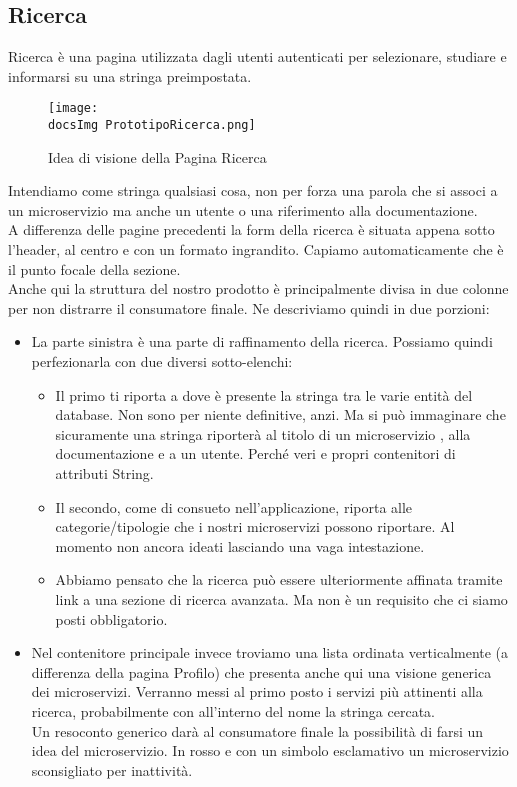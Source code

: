 {	\subsection{Ricerca}{
		Ricerca è una pagina utilizzata dagli utenti autenticati per selezionare, studiare e informarsi su una stringa preimpostata.\\
		\begin{figure}[H]
			\centering
			\texttt{[image: \\docsImg PrototipoRicerca.png]}
			\caption{Idea di visione della Pagina Ricerca}
			\label{PrototipoRicerca}
		\end{figure}
		Intendiamo come stringa qualsiasi cosa, non per forza una parola che si associ a un microservizio ma anche un utente o una riferimento alla documentazione.\\
		A differenza delle pagine precedenti la form della ricerca è situata appena sotto l'header, al centro e con un formato ingrandito. Capiamo automaticamente che è il punto focale della sezione.\\
		Anche qui la struttura del nostro prodotto è principalmente divisa in due colonne per non distrarre il consumatore finale. Ne descriviamo quindi in due porzioni:
		\begin{itemize}
			\item La parte sinistra è una parte di raffinamento della ricerca. Possiamo quindi perfezionarla con due diversi sotto-elenchi:
			\begin{itemize}
				\item Il primo ti riporta a dove è presente la stringa tra le varie entità del database. Non sono per niente definitive, anzi. Ma si può immaginare che sicuramente una stringa riporterà al titolo di un microservizio , alla documentazione e a un utente. Perché veri e propri contenitori di attributi String.
				\item Il secondo, come di consueto nell'applicazione, riporta alle categorie/tipologie che i nostri microservizi possono riportare. Al momento non ancora ideati lasciando una vaga intestazione.
				\item Abbiamo pensato che la ricerca può essere ulteriormente affinata tramite link a una sezione di ricerca avanzata. Ma non è un requisito che ci siamo posti obbligatorio.
			\end{itemize} 
			\item Nel contenitore principale invece troviamo una lista ordinata verticalmente (a differenza della pagina Profilo) che presenta anche qui una visione generica dei microservizi. Verranno messi al primo posto i servizi più attinenti alla ricerca, probabilmente con all'interno del nome la stringa cercata.\\ 
			Un resoconto generico darà al consumatore finale la possibilità di farsi un idea del microservizio. In rosso e con un simbolo esclamativo un microservizio sconsigliato per inattività.  
		\end{itemize}	
	}		
}
